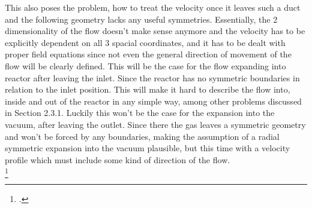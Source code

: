 
	\noindent This also poses the problem, how to treat the velocity once it leaves such a duct and the following geometry lacks any useful symmetries.
	Essentially, the 2 dimensionality of the flow doesn't make sense anymore and the velocity has to be explicitly dependent on all 3 spacial coordinates, and it has to be dealt with proper field equations since not even the general direction of movement of the flow will be clearly defined.
	This will be the case for the flow expanding into reactor after leaving the inlet.
	Since the reactor has no symmetric boundaries in relation to the inlet position.
	This will make it hard to describe the flow into, inside and out of the reactor in any simple way, among other problems discussed in Section 2.3.1.
	Luckily this won't be the case for the expansion into the vacuum, after leaving the outlet.
	Since there the gas leaves a symmetric geometry and won't be forced by any boundaries, making the assumption of a radial symmetric expansion into the vacuum plausible, but this time with a velocity profile which must include some kind of direction of the flow.\\

\footcite[][120]{anderson2021modern}
